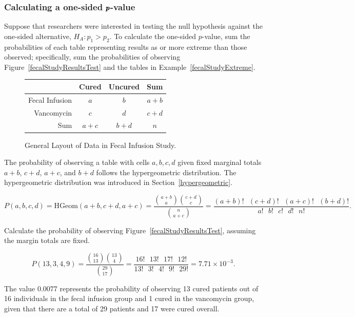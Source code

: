 \subsubsection{Calculating a one-sided $\pmb{\MakeLowercase{p}}$-value}

Suppose that researchers were interested in testing the null hypothesis against the one-sided alternative, $H_A: p_1 > p_2$. To calculate the one-sided $p$-value, sum the probabilities of each table representing results as or more extreme than those observed; specifically, sum the probabilities of observing Figure~\ref{fecalStudyResultsTest} and the tables in Example~\ref{fecalStudyExtreme}.

\begin{figure}[h]
	\centering
	\begin{tabular}{rccc}
		\hline
		& Cured & Uncured & Sum \\ 
		\hline
		Fecal Infusion & $a$ & $b$ & $a+b$ \\ 
		Vancomycin & $c$ & $d$ & $c+d$ \\ 
		Sum & $a+c$ & $b+d$ & $n$ \\ 
		\hline
	\end{tabular}
	\caption{General Layout of Data in Fecal Infusion Study.} 
	\label{fecalStudyGeneral}
\end{figure}

The probability of observing a table with cells $a, b, c, d$ given fixed marginal totals $a+b$, $c+d$, $a + c$, and $b +d$ follows the hypergeometric distribution.  The hypergeometric distribution was introduced in Section~\ref{hypergeometric}.

\[P(a,b,c,d) = \text{HGeom}(a+b, c+d, a+c) = \dfrac{ {a+b \choose a} {c+d \choose c}}{{n \choose a+c}} = \dfrac{(a+b)! \text{ } (c+d)! \text{ } (a+c)! \text{ } (b+d)!}{a! \text{ } b! \text{ } c! \text{ } d! \text{ } n!}.\]

\begin{examplewrap}
\begin{nexample}{Calculate the probability of observing Figure~\ref{fecalStudyResultsTest}, assuming the margin totals are fixed.}

\[P(13, 3, 4, 9) = \dfrac{ {16 \choose 13} {13 \choose 4}}{{29 \choose 17}} = \dfrac{16! \text{ } 13! \text{ } 17! \text{ } 12!}{13! \text{ } 3! \text{ } 4! \text{ } 9! \text{ } 29!} = 7.71 \times 10^{-3}.\]

The value 0.0077 represents the probability of observing 13 cured patients out of 16 individuals in the fecal infusion group and 1 cured in the vancomycin group, given that there are a total of 29 patients and 17 were cured overall.
\end{nexample}
\end{examplewrap}

